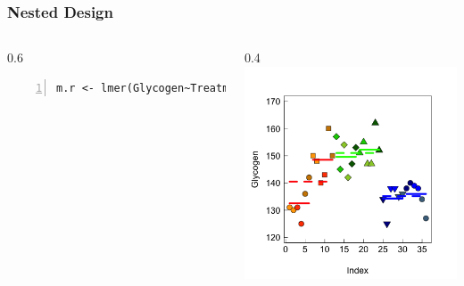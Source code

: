 \documentclass{beamer}
\begin{document}
\begin{frame}[fragile]
    \frametitle{Nested Design}
    \begin{columns}
        \begin{column}{0.6\textwidth}
            \tiny\begin{Verbatim}[numbers=left,numbersep=6pt,frame=single]
m.r <- lmer(Glycogen~Treatment+(1|Rat/Liver), rats)
            \end{Verbatim}
            \scalebox{1}{
                
            }
        \end{column}
        \begin{column}{0.4\textwidth}
            \includegraphics[width=\textwidth]{lectures/day_7_diagnostics_of_mems/figures/unnamed-chunk-3-1.png}
        \end{column}
    \end{columns}
\end{frame}
\end{document}
